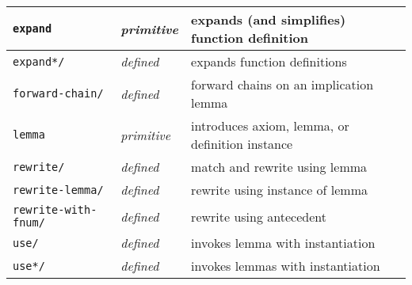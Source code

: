 \documentclass[12pt,twoside]{book}
\makeatletter
\newcommand{\indtt}[1]{\texttt{#1}\index{#1@{\texttt{#1}}}}  %
\newcommand{\indttdol}[1]{\texttt{#1/\char36}\index{#1@{\texttt{#1}}}} %
\makeatother
\begin{document}
\begin{tabular}{|l|l|p{3.2in}|}\hline
\indtt{expand} & \emph{primitive} & expands (and simplifies) function
definition\\\hline
\indttdol{expand*} & \emph{defined} & expands function definitions\\\hline
\indttdol{forward-chain} & \emph{defined} & forward chains on an implication
lemma\\\hline
\indtt{lemma} & \emph{primitive} & introduces axiom, lemma, or
definition instance\\\hline
\indttdol{rewrite} & \emph{defined} & match and rewrite using lemma \\\hline
\indttdol{rewrite-lemma} & \emph{defined} & rewrite using instance of
lemma \\\hline
\indttdol{rewrite-with-fnum} & \emph{defined} & rewrite using antecedent
\\\hline
\indttdol{use} & \emph{defined} & invokes lemma with instantiation
\\\hline
\indttdol{use*} & \emph{defined} & invokes lemmas with instantiation \\\hline
\end{tabular}
\end{document}
